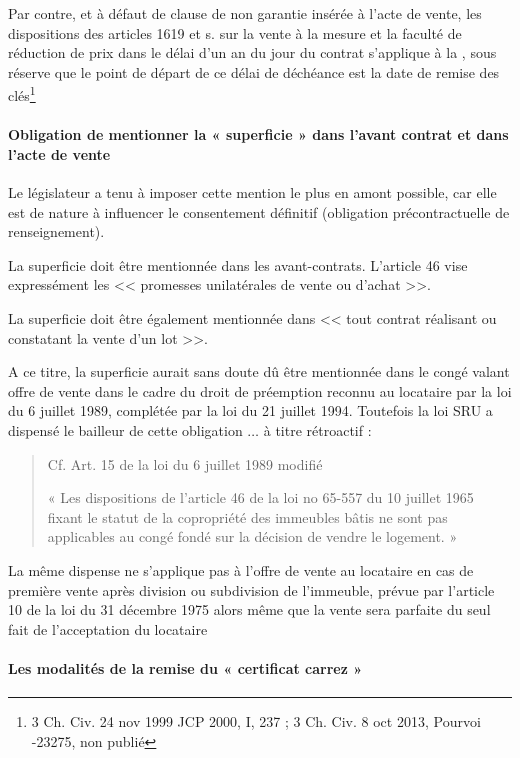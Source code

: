 			Par contre, et à défaut de clause de non garantie insérée à l’acte de vente, les dispositions des articles
			1619 et s. sur la vente à la mesure et la faculté de réduction de prix dans le délai d’un an du jour du contrat
			s’applique à la \VEFA, sous réserve que le point de départ de ce délai de déchéance est la date de remise
			des clés\footnote{3\ieme{} Ch. Civ. 24 nov 1999 JCP 2000, I, 237 ; 3\ieme{} Ch. Civ. 8 oct 2013, Pourvoi -23275, non publié}
			
			\paragraph{Obligation de mentionner la « superficie » dans l’avant contrat et dans l’acte de vente}
			
			\par Le législateur a tenu à imposer cette mention le plus en amont possible, car elle est de nature à influencer
			le consentement définitif (obligation précontractuelle de renseignement).
			
			La superficie doit être mentionnée dans les avant-contrats. L'article 46 vise expressément les << promesses
			unilatérales de vente ou d'achat >>.
			
			La superficie doit être également mentionnée dans << tout contrat réalisant ou constatant la vente d'un lot >>.
			
			A ce titre, la superficie aurait sans doute dû être mentionnée dans le congé valant offre de vente dans le
			cadre du droit de préemption reconnu au locataire par la loi du 6 juillet 1989, complétée par la loi du 21
			juillet 1994. Toutefois la loi SRU a dispensé le bailleur de cette obligation $\dots$ à titre rétroactif :
			\begin{quote}
				Cf. Art. 15 de la loi du 6 juillet 1989 modifié
			
				« Les dispositions de l'article 46 de la loi no 65-557 du 10 juillet 1965 fixant le statut de la copropriété des	immeubles bâtis ne sont pas applicables au congé fondé sur la décision de vendre le logement. »
			\end{quote}
	
			La même dispense ne s’applique pas à l'offre de vente au locataire en cas de première vente après division
			ou subdivision de l'immeuble, prévue par l'article 10 de la loi du 31 décembre 1975 alors même que la
			vente sera parfaite du seul fait de l'acceptation du locataire
			
			\paragraph{Les modalités de la remise du « certificat carrez »}
			

